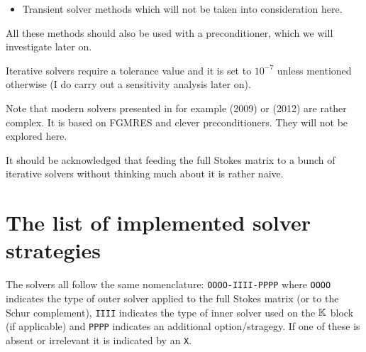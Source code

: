\begin{itemize}
By using CG for the inner solve we pretty much ensure that memory requirements remain very low
but we will then need a good(enough?) preconditioner.
Another variant consists in acknowledging that inside the iterations the 
block $\K$ does not change, so that we can compute its LU decomposition
and use this decomposition every time that we need to solve a linear
system with $\K$. This is \lstinline{solver=14} and \lstinline{solver=23}. 
This option means that the LU factors are stored in the memory longer than in the standard
case but with equal memory use.
\item Transient solver methods \cite{raud22} which will not be taken into consideration here.
\end{itemize}

All these methods should also be used with a preconditioner, which we will investigate later on.

Iterative solvers require a tolerance value and it is set to $10^{-7}$ unless mentioned 
otherwise (I do carry out a sensitivity analysis later on).

Note that modern solvers presented in for example 
\textcite{geum09} (2009) or 
\textcite{krhb12} (2012) are rather complex. It is 
based on FGMRES and clever preconditioners. They will not be explored here.

It should be acknowledged that feeding the full Stokes matrix to a bunch of iterative 
solvers without thinking much about it is rather naive.


\section*{The list of implemented solver strategies}

The solvers all follow the same nomenclature: {\tt OOOO-IIII-PPPP}
where {\tt OOOO} indicates the type of outer solver applied
to the full Stokes matrix (or to the Schur complement), 
{\tt IIII} indicates the type of inner solver
used on the $\K$ block (if applicable) and {\tt PPPP} indicates 
an additional option/stragegy. If one of these is absent or irrelevant it 
is indicated by an {\tt X}.

